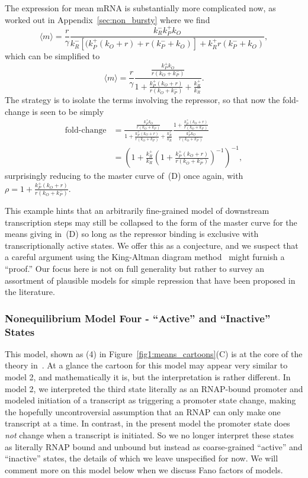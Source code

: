 The expression for mean mRNA is substantially more complicated now, as worked
out in Appendix~\ref{sec:non_bursty} where we find
\begin{equation}
\langle m\rangle = \frac{r}{\gamma}
        \frac{k_R^- k_P^+ k_O}
        {k_R^- [(k_P^+ (k_O + r) + r(k_P^- + k_O)] + k_R^+ r(k_P^- + k_O)},
\end{equation}
which can be simplified to
\begin{equation}
\langle m\rangle
= \frac{r}{\gamma}
\frac{\frac{k_P^+ k_O}{r(k_O + k_P^-)}}
        {1 + \frac{k_P^+ (k_O + r)}{r(k_O + k_P^-)} + \frac{k_R^+}{k_R^-}}.
\end{equation}
The strategy is to isolate the terms involving the repressor, so that now the
fold-change is seen to be simply
\begin{align}
\text{fold-change}
&= \frac{\frac{k_P^+ k_O}{r(k_O + k_P^-)}}
        {1 + \frac{k_P^+ (k_O + r)}{r(k_O + k_P^-)} + \frac{k_R^+}{k_R^-}}
        \frac{1 + \frac{k_P^+ (k_O + r)}{r(k_O + k_P^-)}}
                {\frac{k_P^+ k_O}{r(k_O + k_P^-)}}
\\
&= \left(
        1 + \frac{k_R^+}{k_R^-}
        \left(1 + \frac{k_P^+ (k_O + r)}{r(k_O + k_P^-)}\right)^{-1}
\right)^{-1},
\end{align}
surprisingly reducing to the master curve of~(D) once
again, with $\rho = 1 + \frac{k_P^+ (k_O + r)}{r(k_O + k_P^-)}$.

This example hints that an arbitrarily fine-grained model of downstream
transcription steps may still be collapsed to the form of the master curve for
the means giving in~(D) so long as the repressor
binding is exclusive with transcriptionally active states. We offer this as a
conjecture, and we suspect that a careful argument using the King-Altman diagram
method~\cite{King1956, Hill1966} might furnish a ``proof.'' Our focus here is
not on full generality but rather to survey an assortment of plausible models
for simple repression  that have been proposed in the literature.

\subsubsection{Nonequilibrium Model Four - ``Active'' and ``Inactive'' States}
This model, shown as (4) in Figure~\ref{fig1:means_cartoons}(C) is at the core
of the theory in~\cite{Razo-Mejia2020}. At a glance the cartoon for this model
may appear very similar to model 2, and mathematically it is, but the
interpretation is rather different. In model 2, we interpreted the third state
literally as an RNAP-bound promoter and modeled initiation of a transcript as
triggering a promoter state change, making the hopefully uncontroversial
assumption that an RNAP can only make one transcript at a time. In contrast, in
the present model the promoter state does \textit{not} change when a transcript
is initiated. So we no longer interpret these states as literally RNAP bound and
unbound but instead as coarse-grained ``active'' and ``inactive'' states, the
details of which we leave unspecified for now. We will comment more on this
model below when we discuss Fano factors of models.

